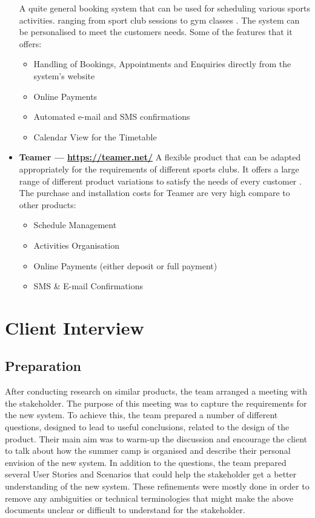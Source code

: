 \documentclass{l3proj}
\begin{document}
\begin{itemize}
A quite general booking system that can be used for scheduling various sports activities. ranging from sport club sessions to gym classes \cite{bug}. The system can be personalised to meet the customers needs. Some of the features that it offers:
		\begin{itemize}
	\item Handling of Bookings, Appointments and Enquiries directly from the system's website
	\item Online Payments
	\item Automated e-mail and SMS confirmations
	\item Calendar View for the Timetable 
		\end{itemize}
\item \textbf{Teamer --- \url{https://teamer.net/}}
A flexible product that can be adapted appropriately for the requirements of different sports clubs. It offers a large range of different product variations to satisfy the needs of every customer \cite{teamer}. The purchase and installation costs for Teamer are very high compare to other products:
		\begin{itemize}
	\item Schedule Management
	\item Activities Organisation
	\item Online Payments (either deposit or full payment)
	\item SMS \& E-mail Confirmations
		\end{itemize}
\end{itemize}
\section{Client Interview}

\subsection{Preparation}
After conducting research on similar products, the team arranged a meeting with the stakeholder.  The purpose of this meeting was to capture the requirements for the new system. To achieve this, the team  prepared a number of different questions, designed to lead to useful conclusions, related to the design of the product. Their main aim was to warm-up the discussion and encourage the client to talk about how the summer camp is organised and describe their personal envision of the new system. In addition to the questions, the team prepared several User Stories and Scenarios that could help the stakeholder get a better understanding of the new system. These refinements were mostly done in order to remove any ambiguities or technical terminologies that might make the above documents unclear or difficult to understand for the stakeholder.
\end{document}
